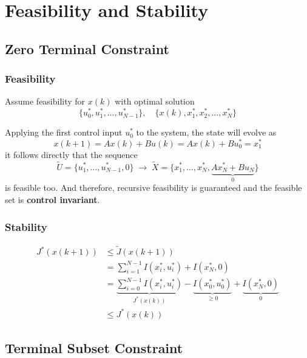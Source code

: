 \section{Feasibility and Stability}
\subsection{Zero Terminal Constraint}
\subsubsection{Feasibility}
Assume feasibility for $x(k)$ with optimal solution
\begin{equation*}
    \{u_0^*, u_1^*, \ldots, u_{N-1}^*\}, \quad \{x(k),x_1^*, x_2^*, \ldots, x_N^*\}
\end{equation*}

Applying the first control input $u_0^*$ to the system, the state will evolve as
\begin{equation*}
    x(k+1) = Ax(k) + Bu(k) = Ax(k) + B u_0^* = x_1^*
\end{equation*}
it follows directly that the sequence
\begin{equation*}
    \widetilde{U}=\{u_1^*, \ldots, u_{N-1}^*, 0\}\; \to \; \widetilde{X}=\{x_1^*, \ldots, x_N^*, \underbrace{Ax_N^* + Bu_N}_{0}\}
\end{equation*}
is feasible too. And therefore, recursive feasibility is guaranteed and the feasible set is \textbf{control invariant}.

\subsubsection{Stability}
\noindent
\begin{align*}
    J^*(x(k+1)) & \leq \widetilde{J}(x(k+1))                                                                                                         \\
                & = \sum_{i=1}^{N-1} I(x_i^*, u_i^*) + I(x_N^*, 0)                                                                                   \\
                & =\underbrace{\sum_{i=0}^{N-1} I(x_i^*, u_i^*)}_{J^*(x(k))} - \underbrace{I(x_0^*, u_0^*)}_{\geq 0}  + \underbrace{I(x_N^*, 0)}_{0} \\
                & \leq J^*(x(k))
\end{align*}

\subsection{Terminal Subset Constraint}
